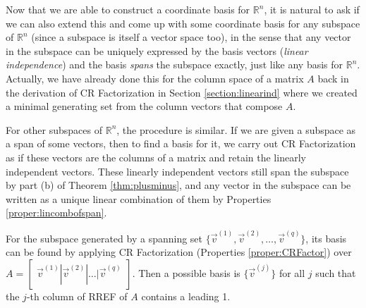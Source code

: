 Now that we are able to construct a coordinate basis for $\mathbb{R}^n$, it is natural to ask if we can also extend this and come up with some coordinate basis for any subspace of $\mathbb{R}^n$ (since a subspace is itself a vector space too), in the sense that any vector in the subspace can be uniquely expressed by the basis vectors (\textit{linear independence}) and the basis \textit{spans} the subspace exactly, just like any basis for $\mathbb{R}^n$. Actually, we have already done this for the column space of a matrix $A$ back in the derivation of CR Factorization in Section \ref{section:linearind} where we created a minimal generating set from the column vectors that compose $A$. \par
For other subspaces of $\mathbb{R}^n$, the procedure is similar. If we are given a subspace as a span of some vectors, then to find a basis for it, we carry out CR Factorization as if these vectors are the columns of a matrix and retain the linearly independent vectors. These linearly independent vectors still span the subspace by part (b) of Theorem \ref{thm:plusminus}, and any vector in the subspace can be written as a unique linear combination of them by Properties \ref{proper:lincombofspan}. 

\begin{proper}
\label{proper:findgenbasis}
For the subspace generated by a spanning set $\{\vec{v}^{(1)}, \vec{v}^{(2)}, \ldots, \allowbreak \vec{v}^{(q)}\}$, its basis can be found by applying CR Factorization (Properties \ref{proper:CRFactor}) over $A = \begin{bmatrix}
\vec{v}^{(1)}|\vec{v}^{(2)}|\ldots|\vec{v}^{(q)}    
\end{bmatrix}$. Then a possible basis is $\{\vec{v}^{(j)}\}$ for all $j$ such that the $j$-th column of RREF of $A$ contains a leading 1.
\end{proper}

